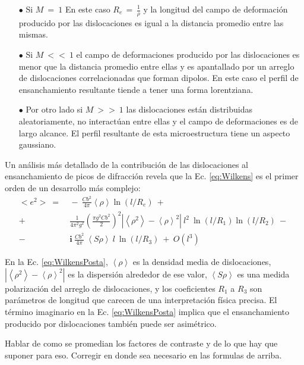\begin{itemize}
  \item[$\bullet$] Si $M \ = \ 1 $ En este caso $R_e\,=\,\frac{1}{\rho}$ y la longitud del campo de deformación producido por las dislocaciones es igual a la distancia promedio entre las mismas.
  \item[$\bullet$] Si $M \ << \ 1 $ el campo de deformaciones producido por las dislocaciones es menor que la distancia promedio entre ellas y es apantallado por un arreglo de dislocaciones correlacionadas que forman dipolos. En este caso el perfil de ensanchamiento resultante tiende a tener una forma lorentziana.
  \item[$\bullet$] Por otro lado si $M \ >> \ 1 $ las dislocaciones están distribuidas aleatoriamente, no interactúan entre ellas y el campo de deformaciones es de largo alcance. El perfil resultante de esta microestructura tiene un aspecto gaussiano.
\end{itemize}

Un análisis más detallado de la contribución de las dislocaciones al ensanchamiento de picos de difracción revela que la Ec. \ref{eq:Wilkens} es el primer orden de un desarrollo más complejo\cite{Groma1988}:
\begin{equation}
  \begin{split}
      <e^2> \ = & \ - \ \frac{Cb^2}{4 \pi}\left< \rho \right> \ln \left( l/R_e \right) \ + \ \\
      + & \ \frac{1}{4\pi^2g^2} \left( \frac{\pi g^2 C b^2}{2} \right)^2 |\left<\rho^2\right> - \left< \rho \right>^2| \ l^2 \ \ln(l/R_1) \ln(l/R_2) \ - \ \\
      - & \ \mathbf{i} \ \frac{Cb^2}{4\pi} \ \left< S\rho \right> \ l \ \ln(l/R_3) \ + \ O(l^3)
  \end{split}
  \label{eq:WilkensPosta}
\end{equation}
\noindent

En la Ec. \ref{eq:WilkensPosta}, $\left< \rho \right>$ es la densidad media de dislocaciones, $|\left<\rho^2\right> - \left< \rho \right>^2|$ es la dispersión alrededor de ese valor, $\left< S\rho \right>$ es una medida polarización del arreglo de dislocaciones, y los coeficientes $R_1$ a $R_3$ son parámetros de longitud que carecen de una interpretación física precisa.
El término imaginario en la Ec. \ref{eq:WilkensPosta} implica que el ensanchamiento producido por dislocaciones también puede ser asimétrico.

Hablar de como se promedian los factores de contraste y de lo que hay que suponer para eso. Corregir en donde sea necesario en las formulas de arriba.

